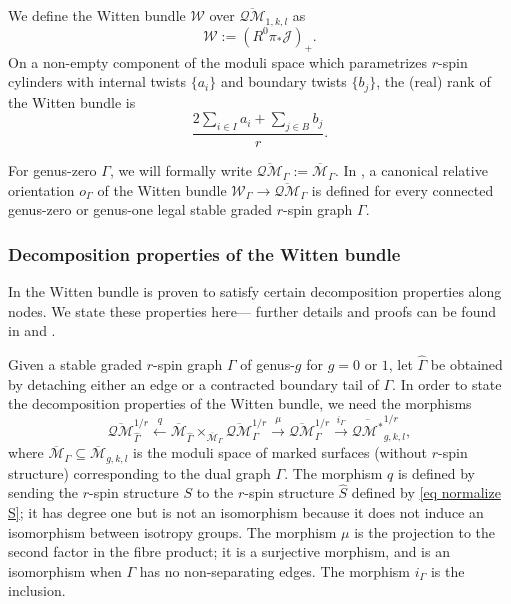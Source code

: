 \documentclass[11pt]{amsart}
\theoremstyle{definition}
\theoremstyle{remark}
\newcommand{\oQMb}{{\overline{\mathcal{QM}}}}
\newcommand{\<}{\left<}
\renewcommand{\>}{\right>}
\numberwithin{equation}{section}
\def\Mbar{{\overline{\mathcal M}}}
\begin{document}
We define the Witten  bundle  $\mathcal W$ over $\oQMb_{1,k,l}$ as 
$${\mathcal{W}}:= (R^0\pi_*\mathcal{J})_+.$$
On a non-empty component of the moduli space which parametrizes $r$-spin cylinders with internal twists $\{a_i\}$ and boundary twists $\{b_j\}$, the (real) rank of the Witten bundle is
\begin{equation}\label{eq rank of witten bundle g=1}\frac{2 \sum_{i\in I} a_i + \sum_{j\in B} b_j }{r}.\end{equation}



For genus-zero $\Gamma$, we will formally write $\oQMb_\Gamma:=\Mbar_{\Gamma}$. 
In \cite[\S 3.2]{TZ1}, a canonical relative orientation $o_\Gamma$ of the Witten bundle $\mathcal W_\Gamma \to \oQMb_\Gamma$ is defined for every connected genus-zero or genus-one legal stable graded $r$-spin graph $\Gamma$.





\subsubsection{Decomposition properties of the Witten bundle}\label{subsec decomp}
In \cite{BCT1,TZ1} the Witten bundle is proven to satisfy certain decomposition properties along nodes.  We state these %
properties here--- further %
details and proofs can be found in \cite{TZ1} and \cite[\S 4.2]{BCT1}.



Given a stable graded $r$-spin graph $\Gamma$ of genus-$g$ for $g=0$ or $1$, let $\widehat{\Gamma}$ be obtained by detaching either an edge or a contracted boundary tail of $\Gamma$.  In order to state the decomposition properties of the Witten bundle, we need the morphisms
\begin{equation}
\label{eq Wittendecompsequence genus one}
\oQMb_{\widehat{\Gamma}}^{1/r} \xleftarrow{q} \Mbar_{\widehat{\Gamma}} \times_{\Mbar_{\Gamma}} \oQMb_{\Gamma}^{1/r} \xrightarrow{\mu} \oQMb_{\Gamma}^{1/r} \xrightarrow{i_{\Gamma}} \overline{\mathcal{QM}^*}_{g,k,l}^{1/r},
\end{equation}
where $\Mbar_{\Gamma} \subseteq \Mbar_{g,k,l}$ is the moduli space of marked surfaces (without $r$-spin structure) corresponding to the dual graph $\Gamma$.  The morphism $q$ is defined by sending the $r$-spin structure $S$ to the $r$-spin structure $\widehat{S}$ defined by \eqref{eq normalize S}; it has degree one but is not an isomorphism because it does not induce an isomorphism between isotropy groups.  The morphism $\mu$ is the projection to the second factor in the fibre product; it is a surjective morphism, and is an isomorphism when $\Gamma$ has no non-separating edges.  The morphism $i_{\Gamma}$ is the inclusion.
\end{document}
